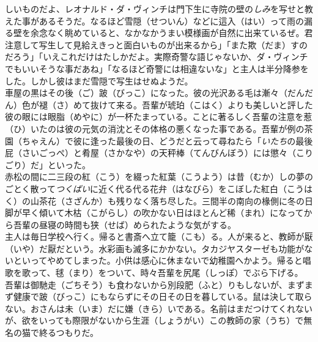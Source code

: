 \documentclass{book}
\begin{document}
しいものだよ、レオナルド・ダ・ヴィンチは門下生に寺院の壁の\emph{しみ}を写せと教えた事があるそうだ。なるほど雪隠（せついん）などに這入（はい）って雨の漏る壁を余念なく眺めていると、なかなかうまい模様画が自然に出来ているぜ。君注意して写生して見給えきっと面白いものが出来るから」「また欺（だま）すのだろう」「いえこれだけはたしかだよ。実際奇警な語じゃないか、ダ・ヴィンチでもいいそうな事だあね」「なるほど奇警には相違ないな」と主人は半分降参をした。しかし彼はまだ雪隠で写生はせぬようだ。\\
車屋の黒はその後（ご）跛（びっこ）になった。彼の光沢ある毛は漸々（だんだん）色が褪（さ）めて抜けて来る。吾輩が琥珀（こはく）よりも美しいと評した彼の眼には眼脂（めやに）が一杯たまっている。ことに著るしく吾輩の注意を惹（ひ）いたのは彼の元気の消沈とその体格の悪くなった事である。吾輩が例の茶園（ちゃえん）で彼に逢った最後の日、どうだと云って尋ねたら「\emph{いたち}の最後屁（さいごっぺ）と肴屋（さかなや）の天秤棒（てんびんぼう）には懲々（こりごり）だ」といった。\\
赤松の間に二三段の紅（こう）を綴った紅葉（こうよう）は昔（むか）しの夢のごとく散って\emph{つくばい}に近く代る代る花弁（はなびら）をこぼした紅白（こうはく）の山茶花（さざんか）も残りなく落ち尽した。三間半の南向の椽側に冬の日脚が早く傾いて木枯（こがらし）の吹かない日はほとんど稀（まれ）になってから吾輩の昼寝の時間も狭（せば）められたような気がする。\\
主人は毎日学校へ行く。帰ると書斎へ立て籠（こも）る。人が来ると、教師が厭（いや）だ厭だという。水彩画も滅多にかかない。タカジヤスターゼも功能がないといってやめてしまった。小供は感心に休まないで幼稚園へかよう。帰ると唱歌を歌って、毬（まり）をついて、時々吾輩を尻尾（しっぽ）でぶら下げる。\\
吾輩は御馳走（ごちそう）も食わないから別段肥（ふと）りもしないが、まずまず健康で跛（びっこ）にもならずにその日その日を暮している。鼠は決して取らない。おさんは未（いま）だに嫌（きら）いである。名前はまだつけてくれないが、欲をいっても際限がないから生涯（しょうがい）この教師の家（うち）で無名の猫で終るつもりだ。\\
\end{document}
